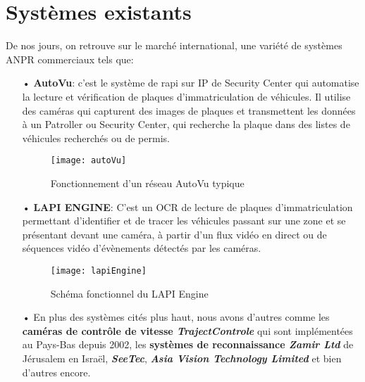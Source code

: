 \section{Systèmes existants}
De nos jours, on retrouve sur le marché international, une variété de systèmes ANPR commerciaux tels que:
    \begin{itemize}
        \item[•]\textbf{AutoVu}: c’est le système de \acrfull{rapi} sur IP de Security Center qui automatise la lecture et vérification de plaques d'immatriculation de véhicules. Il utilise des caméras qui capturent des images de plaques et transmettent les données à un Patroller ou Security Center, qui recherche la plaque dans des listes de véhicules recherchés ou de permis. \cite{autoVu}
            \begin{figure}[H]
                \centering
                \texttt{[image: autoVu]}
                \caption{Fonctionnement d'un réseau AutoVu typique}
            \end{figure}  
        \item[•]\textbf{LAPI ENGINE}: C’est un OCR de lecture de plaques d'immatriculation permettant d'identifier et de tracer les véhicules passant sur une zone et se présentant devant une caméra, à partir d'un flux vidéo en direct ou de séquences vidéo d'évènements détectés par les caméras. \cite{lapiWeb, lapiManual}
        \begin{figure}[H]
            \centering
            \texttt{[image: lapiEngine]}
            \caption{Schéma fonctionnel du LAPI Engine}
        \end{figure} 
        \item[•] En plus des systèmes cités plus haut, nous avons d'autres comme les \textbf{caméras de contrôle de vitesse \textit{TrajectControle}} qui sont implémentées au Pays-Bas depuis 2002, les \textbf{systèmes de reconnaissance \textit{Zamir Ltd}} de Jérusalem en Israël, \textbf{\textit{SeeTec}}, \textbf{\textit{Asia Vision Technology Limited}} et bien d'autres encore. \cite{HindeThesis, NorMaster}
    \end{itemize} 
    
